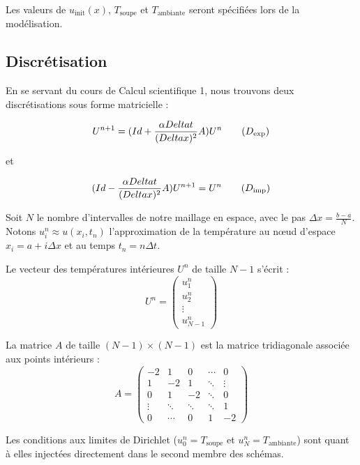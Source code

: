 \documentclass[11pt,a4paper]{article}
\begin{document}
Les valeurs de $u_{\text{init}}(x)$, $T_{\text{soupe}}$ et $T_{\text{ambiante}}$ seront spécifiées lors de la modélisation.

\subsection{Discrétisation}

En se servant du cours de Calcul scientifique 1, nous trouvons deux discrétisations sous forme matricielle :

\begin{equation}
\label{discretisation:explicite}
  U^{n+1} = (Id + \frac{\alpha \Delta t}{(\Delta x)^2} A)U^n
  \tag{$D_{\text{exp}}$}
\end{equation}

et 

\begin{equation}
\label{discretisation:implicite}
  (Id - \frac{\alpha \Delta t}{(\Delta x)^2} A)U^{n+1} = U^n
  \tag{$D_{\text{imp}}$}
\end{equation}

Soit $N$ le nombre d'intervalles de notre maillage en espace, avec le pas $\Delta x = \frac{b-a}{N}$. 
Notons $u_i^n \approx u(x_i, t_n)$ l'approximation de la température au nœud d'espace $x_i = a + i\Delta x$ et au temps $t_n = n\Delta t$.

Le vecteur des températures intérieures $U^n$ de taille $N-1$ s'écrit :
$$
U^n =
\begin{pmatrix}
u_1^n \\
u_2^n \\
\vdots \\
u_{N-1}^n
\end{pmatrix}
$$

La matrice $A$ de taille $(N-1) \times (N-1)$ est la matrice tridiagonale associée aux points intérieurs :
$$
A = 
\begin{pmatrix}
-2 & 1  & 0  & \cdots & 0 \\
1  & -2 & 1  & \ddots & \vdots \\
0  & 1  & -2 & \ddots & 0 \\
\vdots & \ddots & \ddots & \ddots & 1 \\
0  & \cdots & 0 & 1 & -2
\end{pmatrix}
$$

Les conditions aux limites de Dirichlet ($u_0^n = T_{\text{soupe}}$ et $u_N^n = T_{\text{ambiante}}$) sont quant à elles injectées directement dans le second membre des schémas.
\end{document}
